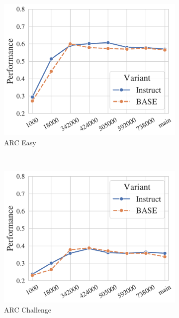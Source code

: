 \begin{figure}[t!]
    \centering
    \begin{subfigure}[b]{0.3\textwidth}
    \includegraphics[width=\the\columnwidth]{figures/fig_files/it_ckpts/it_evalarc_easy.pdf}
        \caption{ARC Easy}
    \end{subfigure}%
    ~ 
    \begin{subfigure}[b]{0.3\textwidth}
    \includegraphics[width=\the\columnwidth]{figures/fig_files/it_ckpts/it_evalarc_challenge.pdf}
        \caption{ARC Challenge}
    \end{subfigure}%
    ~ 
    \begin{subfigure}[b]{0.3\textwidth}

\end{subfigure}
\end{figure}
